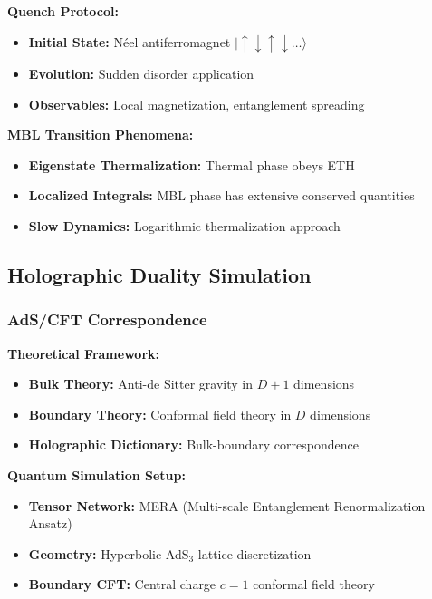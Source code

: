 \documentclass[11pt,a4paper,twoside]{article}
\begin{document}
\textbf{Quench Protocol:}
\begin{itemize}[leftmargin=*]
    \item \textbf{Initial State:} Néel antiferromagnet $|\uparrow\downarrow\uparrow\downarrow\ldots\rangle$
    \item \textbf{Evolution:} Sudden disorder application
    \item \textbf{Observables:} Local magnetization, entanglement spreading
\end{itemize}

\textbf{MBL Transition Phenomena:}
\begin{itemize}[leftmargin=*]
    \item \textbf{Eigenstate Thermalization:} Thermal phase obeys ETH
    \item \textbf{Localized Integrals:} MBL phase has extensive conserved quantities
    \item \textbf{Slow Dynamics:} Logarithmic thermalization approach
\end{itemize}

\subsection{Holographic Duality Simulation}

\subsubsection{AdS/CFT Correspondence}

\textbf{Theoretical Framework:}
\begin{itemize}[leftmargin=*]
    \item \textbf{Bulk Theory:} Anti-de Sitter gravity in $D+1$ dimensions
    \item \textbf{Boundary Theory:} Conformal field theory in $D$ dimensions
    \item \textbf{Holographic Dictionary:} Bulk-boundary correspondence
\end{itemize}

\textbf{Quantum Simulation Setup:}
\begin{itemize}[leftmargin=*]
    \item \textbf{Tensor Network:} MERA (Multi-scale Entanglement Renormalization Ansatz)
    \item \textbf{Geometry:} Hyperbolic AdS$_3$ lattice discretization
    \item \textbf{Boundary CFT:} Central charge $c = 1$ conformal field theory
\end{itemize}
\end{document}
